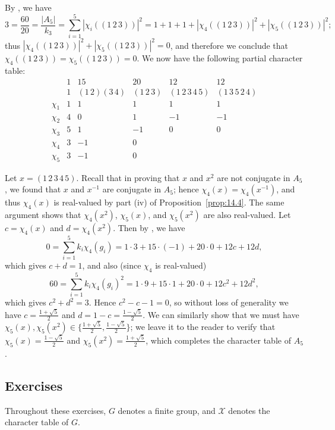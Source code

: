 \documentclass[../Odyssey_Project.tex]{subfiles}
\begin{document}
\begin{example}
By , we have
\[
    3 = \frac{60}{20} = \frac{|A_5|}{k_3} = \sum_{i=1}^{5} |\chi_i((1\,2\,3))|^2 = 1 + 1 + 1 + |\chi_4((1\,2\,3))|^2 + |\chi_5((1\,2\,3))|^2;
\]
thus $|\chi_4((1\,2\,3))|^2 + |\chi_5((1\,2\,3))|^2 = 0$, and therefore we conclude that $\chi_4((1\,2\,3)) = \chi_5((1\,2\,3)) = 0$. We now have the following partial character table:
\[
    \begin{array}{c|ccccc}
        & 1 & 15 & 20 & 12 & 12 \\
        & 1 & (1\,2)(3\,4) & (1\,2\,3) & (1\,2\,3\,4\,5) & (1\,3\,5\,2\,4) \\
        \hline
        \chi_1 & 1 & 1 & 1 & 1 & 1 \\
        \chi_2 & 4 & 0 & 1 & -1 & -1 \\
        \chi_3 & 5 & 1 & -1 & 0 & 0 \\
        \chi_4 & 3 & -1 & 0 & & \\
        \chi_5 & 3 & -1 & 0 & &
    \end{array}
\]

Let $x = (1\,2\,3\,4\,5)$. Recall that in proving that $x$ and $x^2$ are not conjugate in $A_5$, we found that $x$ and $x^{-1}$ are conjugate in $A_5$; hence $\chi_4(x) = \chi_4(x^{-1})$, and thus $\chi_4(x)$ is real-valued by part (iv) of Proposition~\ref{prop:14.4}. The same argument shows that $\chi_4(x^2)$, $\chi_5(x)$, and $\chi_5(x^2)$ are also real-valued. Let $c = \chi_4(x)$ and $d = \chi_4(x^2)$. Then by , we have
\[
    0 = \sum_{i=1}^{5} k_i \chi_4(g_i) = 1 \cdot 3 + 15 \cdot (-1) + 20 \cdot 0 + 12c + 12d,
\]
which gives $c + d = 1$, and also (since $\chi_4$ is real-valued)
\[
    60 = \sum_{i=1}^{5} k_i \chi_4(g_i)^2 = 1 \cdot 9 + 15 \cdot 1 + 20 \cdot 0 + 12c^2 + 12d^2,
\]
which gives $c^2 + d^2 = 3$. Hence $c^2 - c - 1 = 0$, so without loss of generality we have $c = \frac{1 + \sqrt{5}}{2}$ and $d = 1 - c = \frac{1 - \sqrt{5}}{2}$. We can similarly show that we must have $\chi_5(x), \chi_5(x^2) \in \{\frac{1 + \sqrt{5}}{2}, \frac{1 - \sqrt{5}}{2}\}$; we leave it to the reader to verify that $\chi_5(x) = \frac{1 - \sqrt{5}}{2}$ and $\chi_5(x^2) = \frac{1 + \sqrt{5}}{2}$, which completes the character table of $A_5$.
\end{example}

\subsection*{Exercises}

Throughout these exercises, $G$ denotes a finite group, and $\mathcal{X}$ denotes the character table of $G$.
\end{document}
